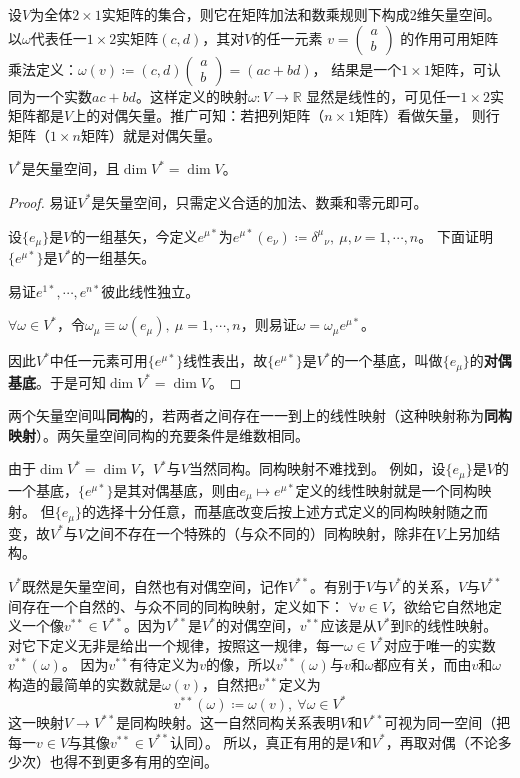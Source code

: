 \begin{example}
设$V$为全体$2 \times 1$实矩阵的集合，则它在矩阵加法和数乘规则下构成$2$维矢量空间。
以$\omega$代表任一$1 \times 2$实矩阵$(c, d)$，其对$V$的任一元素
$v = \begin{pmatrix}a \\ b\end{pmatrix}$
的作用可用矩阵乘法定义：$\omega(v) \coloneq (c, d)\begin{pmatrix}a \\ b\end{pmatrix} = (ac + bd)$，
结果是一个$1 \times 1$矩阵，可认同为一个实数$ac + bd$。这样定义的映射$\omega \colon V \to \mathbb{R}$
显然是线性的，可见任一$1 \times 2$实矩阵都是$V$上的对偶矢量。推广可知：若把列矩阵（$n \times 1$矩阵）看做矢量，
则行矩阵（$1 \times n$矩阵）就是对偶矢量。
\end{example}

\begin{theorem}
$V^*$是矢量空间，且$\dim V^* = \dim V$。
\end{theorem}

\begin{proof}
易证$V^*$是矢量空间，只需定义合适的加法、数乘和零元即可。

设$\{e_\mu\}$是$V$的一组基矢，今定义$e^{\mu*}$为$e^{\mu*}(e_\nu) \coloneq \delta^\mu{}_\nu, ~ \mu, \nu = 1, \cdots, n$。
下面证明$\{e^{\mu*}\}$是$V^*$的一组基矢。

易证$e^{1*}, \cdots, e^{n*}$彼此线性独立。

$\forall \omega \in V^*$，令$\omega_\mu \equiv \omega(e_\mu), ~ \mu = 1, \cdots, n$，则易证$\omega = \omega_\mu e^{\mu*}$。

因此$V^*$中任一元素可用$\{e^{\mu*}\}$线性表出，故$\{e^{\mu*}\}$是$V^*$的一个基底，叫做$\{e_\mu\}$的\textbf{对偶基底}。于是可知$\dim V^* = \dim V$。
\end{proof}

两个矢量空间叫\textbf{同构}的，若两者之间存在一一到上的线性映射（这种映射称为\textbf{同构映射}）。两矢量空间同构的充要条件是维数相同。

由于$\dim V^* = \dim V$，$V^*$与$V$当然同构。同构映射不难找到。
例如，设$\{e_\mu\}$是$V$的一个基底，$\{e^{\mu*}\}$是其对偶基底，则由$e_\mu \mapsto e^{\mu*}$定义的线性映射就是一个同构映射。
但$\{e_\mu\}$的选择十分任意，而基底改变后按上述方式定义的同构映射随之而变，故$V^*$与$V$之间不存在一个特殊的（与众不同的）同构映射，除非在$V$上另加结构。

$V^*$既然是矢量空间，自然也有对偶空间，记作$V^{**}$。有别于$V$与$V^*$的关系，$V$与$V^{**}$间存在一个自然的、与众不同的同构映射，定义如下：
$\forall v \in V$，欲给它自然地定义一个像$v^{**} \in V^{**}$。因为$V^{**}$是$V^*$的对偶空间，$v^{**}$应该是从$V^*$到$\mathbb{R}$的线性映射。
对它下定义无非是给出一个规律，按照这一规律，每一$\omega \in V^*$对应于唯一的实数$v^{**}(\omega)$。
因为$v^{**}$有待定义为$v$的像，所以$v^{**}(\omega)$与$v$和$\omega$都应有关，而由$v$和$\omega$构造的最简单的实数就是$\omega(v)$，自然把$v^{**}$定义为
$$v^{**}(\omega) \coloneq \omega(v), ~ \forall \omega \in V^*$$
这一映射$V \to V^{**}$是同构映射。这一自然同构关系表明$V$和$V^{**}$可视为同一空间（把每一$v \in V$与其像$v^{**} \in V^{**}$认同）。
所以，真正有用的是$V$和$V^*$，再取对偶（不论多少次）也得不到更多有用的空间。

